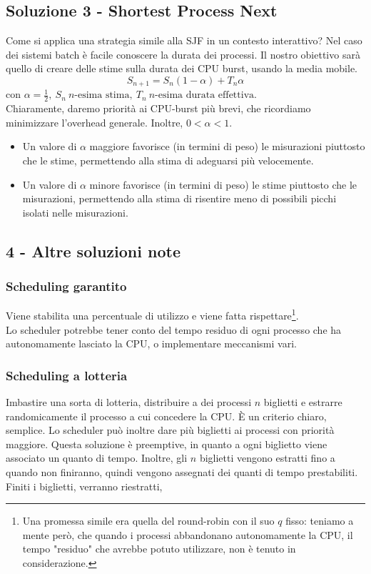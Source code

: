 \documentclass{report}
\begin{document}
\subsection{Soluzione 3 - Shortest Process Next}
Come si applica una strategia simile alla SJF in un contesto interattivo? Nel caso dei sistemi batch è facile conoscere la durata dei processi. Il nostro obiettivo sarà quello di creare delle stime sulla durata dei CPU burst, usando la media mobile.
$$
S_{n+1} = S_n(1-\alpha) + T_n \alpha
$$
con $\alpha = \frac{1}{2}, \ S_n \ n\text{-esima stima}, \ T_n \ n\text{-esima durata effettiva}$.\\
Chiaramente, daremo priorità ai CPU-burst più brevi, che ricordiamo minimizzare l'overhead generale. Inoltre, $0<\alpha<1$.
\begin{itemize}
    \item Un valore di $\alpha$ maggiore favorisce (in termini di peso) le misurazioni piuttosto che le stime, permettendo alla stima di adeguarsi più velocemente.
    \item Un valore di $\alpha$ minore favorisce (in termini di peso) le stime piuttosto che le misurazioni, permettendo alla stima di risentire meno di possibili picchi isolati nelle misurazioni.
\end{itemize}

\newpage

\subsection{ 4 - Altre soluzioni note}

\subsubsection{Scheduling garantito}
Viene stabilita una percentuale di utilizzo e viene fatta rispettare\footnote{Una promessa simile era quella del round-robin con il suo $q$ fisso: teniamo a mente però, che quando i processi abbandonano autonomamente la CPU, il tempo "residuo" che avrebbe potuto utilizzare, non è tenuto in considerazione.}.\\
Lo scheduler potrebbe tener conto del tempo residuo di ogni processo che ha autonomamente lasciato la CPU, o implementare meccanismi vari.

\subsubsection{Scheduling a lotteria}
Imbastire una sorta di lotteria, distribuire a dei processi $n$ biglietti e estrarre randomicamente il processo a cui concedere la CPU. È un criterio chiaro, semplice. Lo scheduler può inoltre dare più biglietti ai processi con priorità maggiore. Questa soluzione è preemptive, in quanto a ogni biglietto viene associato un quanto di tempo. Inoltre, gli $n$ biglietti vengono estratti fino a quando non finiranno, quindi vengono assegnati dei quanti di tempo prestabiliti. Finiti i biglietti, verranno riestratti,
\end{document}
